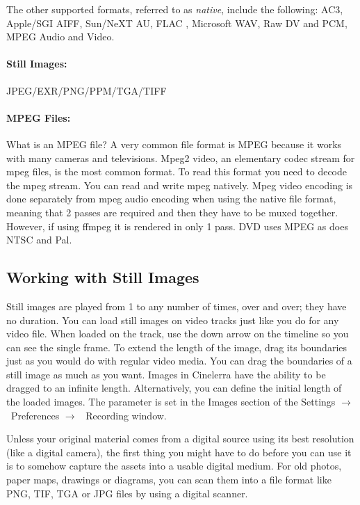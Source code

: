 The other supported formats, referred to as \textit{native},  include the following:
AC3, 
Apple/SGI AIFF,
Sun/NeXT AU,
FLAC ,
Microsoft WAV,
Raw DV and PCM,
MPEG Audio and Video.

\paragraph{Still Images:}  JPEG/EXR/PNG/PPM/TGA/TIFF

\paragraph{MPEG Files:} 
What is an MPEG file?  A very common file format is MPEG because it works with many cameras and televisions.  Mpeg2 video, an elementary codec stream for mpeg files, is the most common format.  To read this format you need to decode the mpeg stream.  You can read and write mpeg natively.  Mpeg video encoding is done separately from mpeg audio encoding when using the native file format, meaning that 2 passes are required and then they have to be muxed together.  However, if using ffmpeg it is rendered in only 1 pass.  DVD uses MPEG as does NTSC and Pal.

\subsection{Working with Still Images}%
\label{sub:working_with_still_images}

Still images are played from 1 to any number of times, over and over; they have no duration. You can load still images on video tracks just like you do for any video file. When loaded on the track, use the down arrow on the timeline so you can see the single frame. To extend the length of the image, drag its boundaries just as you would do with regular video media. You can drag the boundaries of a still image as much as you want. Images in Cinelerra have the ability to be dragged to an infinite length. Alternatively, you can define the initial length of the loaded images. The parameter is set in the Images section of the Settings $\rightarrow$ ~Preferences $\rightarrow$ ~Recording window.

Unless your original material comes from a digital source using its best resolution (like a digital camera), the first thing you might have to do before you can use it is to somehow capture the assets into a usable digital medium. For old photos, paper maps, drawings or diagrams, you can scan them into a file format like PNG, TIF, TGA or JPG files by using a digital scanner.


